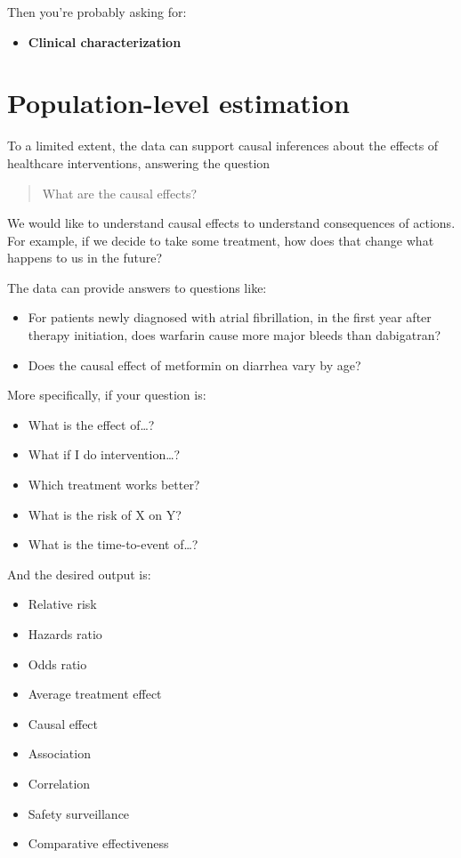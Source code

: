 \documentclass[11pt]{book}
\providecommand{\tightlist}{%
  \setlength{\itemsep}{0pt}\setlength{\parskip}{0pt}}
\theoremstyle{definition}
\theoremstyle{definition}
\theoremstyle{definition}
\theoremstyle{remark}
\begin{document}
Then you're probably asking for:

\begin{itemize}
\tightlist
\item
  \textbf{Clinical characterization}
\end{itemize}

\hypertarget{population-level-estimation}{%
\section{Population-level estimation}\label{population-level-estimation}}

To a limited extent, the data can support causal inferences about the effects of healthcare interventions, answering the question

\begin{quote}
What are the causal effects?
\end{quote}

We would like to understand causal effects to understand consequences of actions. For example, if we decide to take some treatment, how does that change what happens to us in the future?

The data can provide answers to questions like:

\begin{itemize}
\tightlist
\item
  For patients newly diagnosed with atrial fibrillation, in the first year after therapy initiation, does warfarin cause more major bleeds than dabigatran?
\item
  Does the causal effect of metformin on diarrhea vary by age?
\end{itemize}

More specifically, if your question is:

\begin{itemize}
\tightlist
\item
  What is the effect of\ldots?
\item
  What if I do intervention\ldots?
\item
  Which treatment works better?
\item
  What is the risk of X on Y?
\item
  What is the time-to-event of\ldots?
\end{itemize}

And the desired output is:

\begin{itemize}
\tightlist
\item
  Relative risk
\item
  Hazards ratio
\item
  Odds ratio
\item
  Average treatment effect
\item
  Causal effect
\item
  Association
\item
  Correlation
\item
  Safety surveillance
\item
  Comparative effectiveness
\end{itemize}
\end{document}
